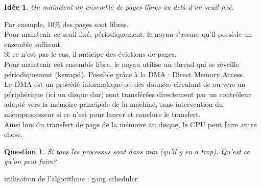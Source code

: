 \documentclass[12pt,a4paper]{report}
\newtheorem*{q}{Question}
\newtheorem*{id}{Idée}
\begin{document}
\begin{id} On maintient un ensemble de pages libres au delà d'un seuil fixé.\end{id}
Par exemple, 10\% des pages sont libres.\\

Pour maintenir ce seuil fixé, périodiquement, le noyau s'assure qu'il possède un ensemble suffisant.\\
Si ce n'est pas le cas, il anticipe des évictions de pages.\\
Pour maintenir cet ensemble libre, le noyau utilise un thread qui se réveille périodiquement (kswapd). Possible grâce à la DMA : Direct Memory Access.\\

La DMA est un procédé informatique où des données circulant de ou vers un périphérique (ici un disque dur) sont transférées directement par un contrôleur adapté vers la mémoire principale de la machine, sans intervention du microprocesseur si ce n'est pour lancer et conclure le transfert.\\

Ainsi lors du transfert de page de la mémoire au disque, le CPU peut faire autre chose.\\

\begin{q}
Si tous les processus sont dans min (qu'il y en a trop). Qu'est ce qu'on peut faire?\end{q}
utilisation de l’algorithme : gang scheduler
\end{document}
